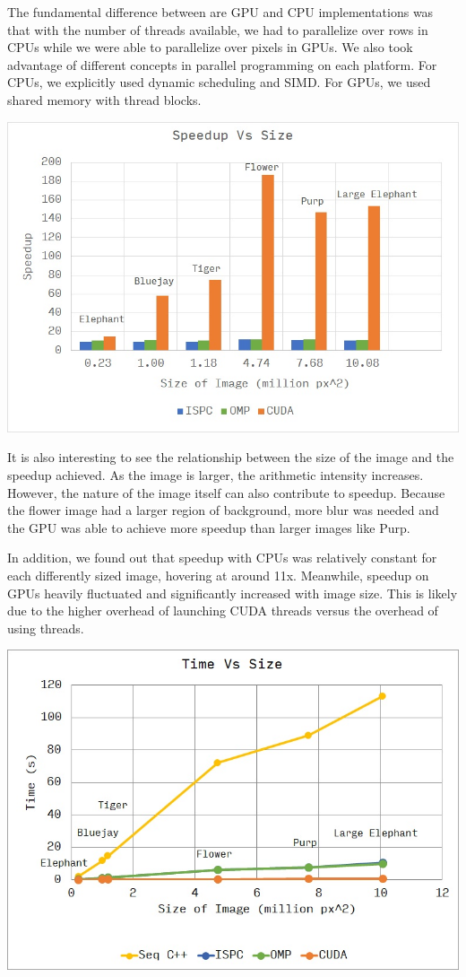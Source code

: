 \documentclass[12pt]{article}
\begin{document}
The fundamental difference between are GPU and CPU implementations was that
with the number of threads available, we had to parallelize over rows in CPUs
while we were able to parallelize over pixels in GPUs. We also took advantage
of different concepts in parallel programming on each platform. For CPUs, we
explicitly used dynamic scheduling and SIMD. For GPUs, we used shared memory
with thread blocks.

\begin{center}
\includegraphics[scale=0.8]{speedup.jpg}
\end{center}

It is also interesting to see the relationship between the size of the image
and the speedup achieved. As the image is larger, the arithmetic intensity
increases. However, the nature of the image itself can also contribute to
speedup. Because the flower image had a larger region of background, more blur
was needed and the GPU was able to achieve more speedup than larger images like
Purp.

In addition, we found out that speedup with CPUs was relatively constant for
each differently sized image, hovering at around 11x. Meanwhile, speedup on
GPUs heavily fluctuated and significantly increased with image size. This is
likely due to the higher overhead of launching CUDA threads versus the overhead
of using threads.

\begin{center}
\includegraphics[scale=0.8]{time.jpg}
\end{center}
\end{document}
